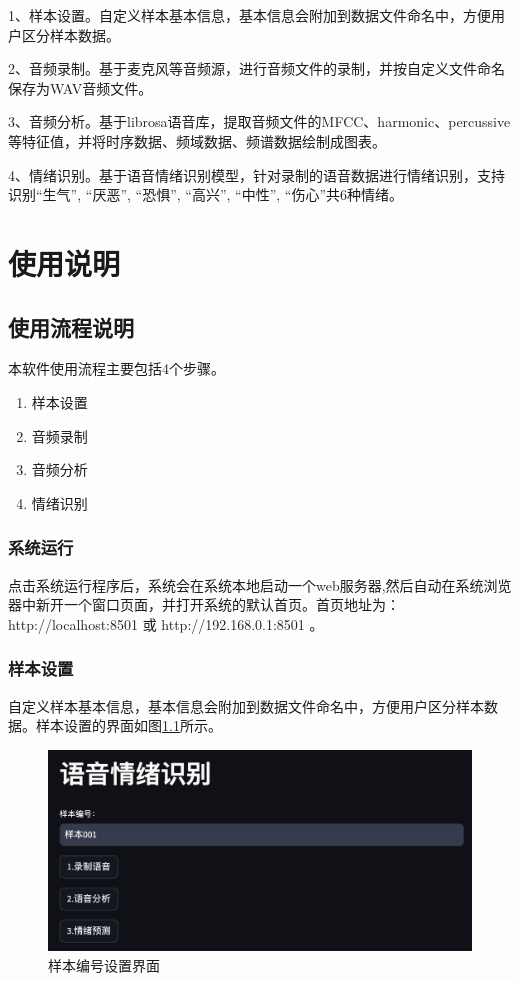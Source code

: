 \documentclass[lang=cn,newtx,12pt,scheme=chinese]{elegantbook}
\begin{document}
1、样本设置。自定义样本基本信息，基本信息会附加到数据文件命名中，方便用户区分样本数据。

2、音频录制。基于麦克风等音频源，进行音频文件的录制，并按自定义文件命名保存为WAV音频文件。

3、音频分析。基于librosa语音库，提取音频文件的MFCC、harmonic、percussive等特征值，并将时序数据、频域数据、频谱数据绘制成图表。

4、情绪识别。基于语音情绪识别模型，针对录制的语音数据进行情绪识别，支持识别“生气”, “厌恶”, “恐惧”, “高兴”, “中性”, “伤心”共6种情绪。


\chapter{使用说明}

\section{使用流程说明}

本软件使用流程主要包括4个步骤。

\begin{enumerate}
  \item 样本设置
  \item 音频录制
  \item 音频分析
  \item 情绪识别
\end{enumerate}

\subsection{系统运行}

点击系统运行程序后，系统会在系统本地启动一个web服务器,然后自动在系统浏览器中新开一个窗口页面，并打开系统的默认首页。首页地址为： http://localhost:8501  或 http://192.168.0.1:8501 。


\subsection{样本设置}

自定义样本基本信息，基本信息会附加到数据文件命名中，方便用户区分样本数据。样本设置的界面如图\ref{fig1}所示。

\begin{figure}
	\label{fig1}
	\includegraphics[width=\textwidth]{image/截图1.png}
	\caption{样本编号设置界面}
\end{figure}
\end{document}
